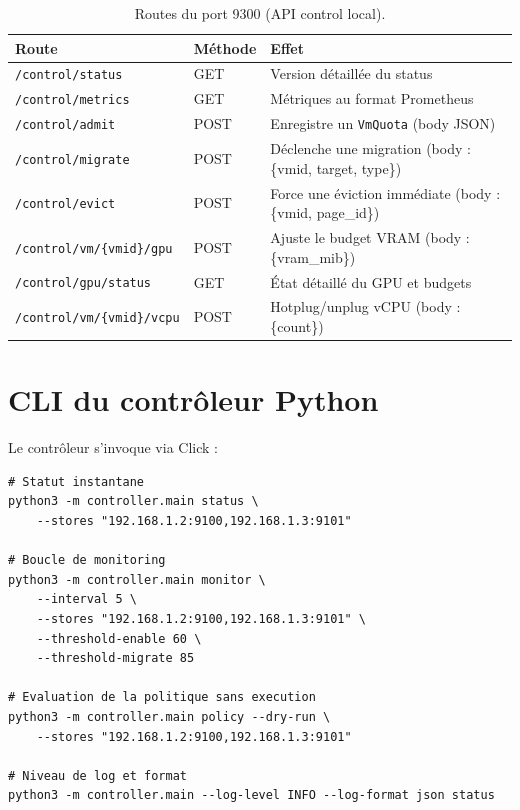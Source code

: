 \begin{table}[H]
\centering
\small
\begin{tabular}{lp{2.5cm}p{7.5cm}}
\toprule
\textbf{Route} & \textbf{Méthode} & \textbf{Effet} \\
\midrule
\texttt{/control/status}          & GET  & Version détaillée du status \\
\texttt{/control/metrics}         & GET  & Métriques au format Prometheus \\
\texttt{/control/admit}           & POST & Enregistre un \texttt{VmQuota} (body JSON) \\
\texttt{/control/migrate}         & POST & Déclenche une migration (body : \{vmid, target, type\}) \\
\texttt{/control/evict}           & POST & Force une éviction immédiate (body : \{vmid, page\_id\}) \\
\texttt{/control/vm/\{vmid\}/gpu} & POST & Ajuste le budget VRAM (body : \{vram\_mib\}) \\
\texttt{/control/gpu/status}      & GET  & État détaillé du GPU et budgets \\
\texttt{/control/vm/\{vmid\}/vcpu}& POST & Hotplug/unplug vCPU (body : \{count\}) \\
\bottomrule
\end{tabular}
\caption{Routes du port 9300 (API control local).}
\end{table}

\section{CLI du contrôleur Python}

Le contrôleur s'invoque via Click :

\begin{lstlisting}[basicstyle=\ttfamily\footnotesize, frame=single]
# Statut instantane
python3 -m controller.main status \
    --stores "192.168.1.2:9100,192.168.1.3:9101"

# Boucle de monitoring
python3 -m controller.main monitor \
    --interval 5 \
    --stores "192.168.1.2:9100,192.168.1.3:9101" \
    --threshold-enable 60 \
    --threshold-migrate 85

# Evaluation de la politique sans execution
python3 -m controller.main policy --dry-run \
    --stores "192.168.1.2:9100,192.168.1.3:9101"

# Niveau de log et format
python3 -m controller.main --log-level INFO --log-format json status
\end{lstlisting}
